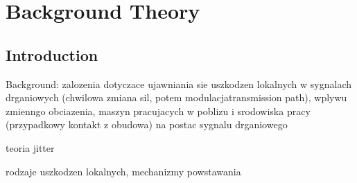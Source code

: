 \chapter{Background Theory}

\label{ch:background}

\section{Introduction}

Background:
zalozenia dotyczace ujawniania sie uszkodzen lokalnych w sygnalach drganiowych (chwilowa zmiana sil, potem modulacja\/transmission path), wplywu zmienngo obciazenia, maszyn pracujacych w poblizu i srodowiska pracy (przypadkowy kontakt z obudowa) na postac sygnalu drganiowego

teoria jitter

rodzaje uszkodzen lokalnych, mechanizmy powstawania 

